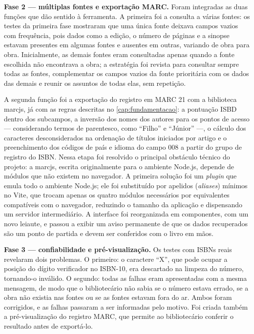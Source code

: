 \textbf{Fase 2 --- múltiplas fontes e exportação MARC.} Foram integradas as duas funções que dão sentido à ferramenta. A primeira foi a consulta a várias fontes: os testes da primeira fase mostraram que uma única fonte deixava campos vazios com frequência, pois dados como a edição, o número de páginas e a sinopse estavam presentes em algumas fontes e ausentes em outras, variando de obra para obra. Inicialmente, as demais fontes eram consultadas apenas quando a fonte escolhida não encontrava a obra; a estratégia foi revista para consultar sempre todas as fontes, complementar os campos vazios da fonte prioritária com os dados das demais e reunir os assuntos de todas elas, sem repetição.

A segunda função foi a exportação do registro em MARC 21 com a biblioteca marcjs, já com as regras descritas no \autoref{cap:fundamentacao}: a pontuação ISBD dentro dos subcampos, a inversão dos nomes dos autores para os pontos de acesso --- considerando termos de parentesco, como ``Filho'' e ``Júnior'' ---, o cálculo dos caracteres desconsiderados na ordenação de títulos iniciados por artigo e o preenchimento dos códigos de país e idioma do campo 008 a partir do grupo de registro do ISBN.
Nessa etapa foi resolvido o principal obstáculo técnico do projeto: a marcjs, escrita originalmente para o ambiente Node.js, depende de módulos que não existem no navegador. A primeira solução foi um \textit{plugin} que emula todo o ambiente Node.js; ele foi substituído por apelidos (\textit{aliases}) mínimos no Vite, que trocam apenas os quatro módulos necessários por equivalentes compatíveis com o navegador, reduzindo o tamanho da aplicação e dispensando um servidor intermediário. A interface foi reorganizada em componentes, com um novo leiaute, e passou a exibir um aviso permanente de que os dados recuperados são um ponto de partida e devem ser conferidos com o livro em mãos.

\textbf{Fase 3 --- confiabilidade e pré-visualização.} Os testes com ISBNs reais revelaram dois problemas. O primeiro: o caractere ``X'', que pode ocupar a posição do dígito verificador no ISBN-10, era descartado na limpeza do número, tornando-o inválido. O segundo: todas as falhas eram apresentadas com a mesma mensagem, de modo que o bibliotecário não sabia se o número estava errado, se a obra não existia nas fontes ou se as fontes estavam fora do ar. Ambos foram corrigidos, e as falhas passaram a ser informadas pelo motivo. Foi criada também a pré-visualização do registro MARC, que permite ao bibliotecário conferir o resultado antes de exportá-lo.

